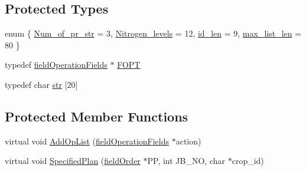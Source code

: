 \subsection*{Protected Types}
\begin{DoxyCompactItemize}
\item 
enum \{ \hyperlink{classstatic_crop_af520b767faa0ce7e6a94316f33a240f2a412a7b7b0c631dbf3ede94aacf201764}{Num\_\-of\_\-pr\_\-str} = 3, 
\hyperlink{classstatic_crop_af520b767faa0ce7e6a94316f33a240f2aab7503994ded0fb6f244911e20134c65}{Nitrogen\_\-levels} = 12, 
\hyperlink{classstatic_crop_af520b767faa0ce7e6a94316f33a240f2a253ef968e3b54314a7da77fade0b48bf}{id\_\-len} = 9, 
\hyperlink{classstatic_crop_af520b767faa0ce7e6a94316f33a240f2ae5fefade0ea78f802eee11cfe0c3d1ad}{max\_\-list\_\-len} = 80
 \}
\item 
typedef \hyperlink{classfield_operation_fields}{fieldOperationFields} $\ast$ \hyperlink{classstatic_crop_a6eb8fb6c3d2353627729635751b7ea27}{FOPT}
\item 
typedef char \hyperlink{classstatic_crop_a78a95a86fbeacaf0b89d6a1e06e505f0}{str} \mbox{[}20\mbox{]}
\end{DoxyCompactItemize}
\subsection*{Protected Member Functions}
\begin{DoxyCompactItemize}
\item 
virtual void \hyperlink{classstatic_crop_a2496f37ddd62d263ec98d0b5868dbc5e}{AddOpList} (\hyperlink{classfield_operation_fields}{fieldOperationFields} $\ast$action)
\item 
virtual void \hyperlink{classstatic_crop_af19d8a1e4f4833325f6712c22ede8b45}{SpecifiedPlan} (\hyperlink{classfield_order}{fieldOrder} $\ast$PP, int JB\_\-NO, char $\ast$crop\_\-id)
\end{DoxyCompactItemize}
